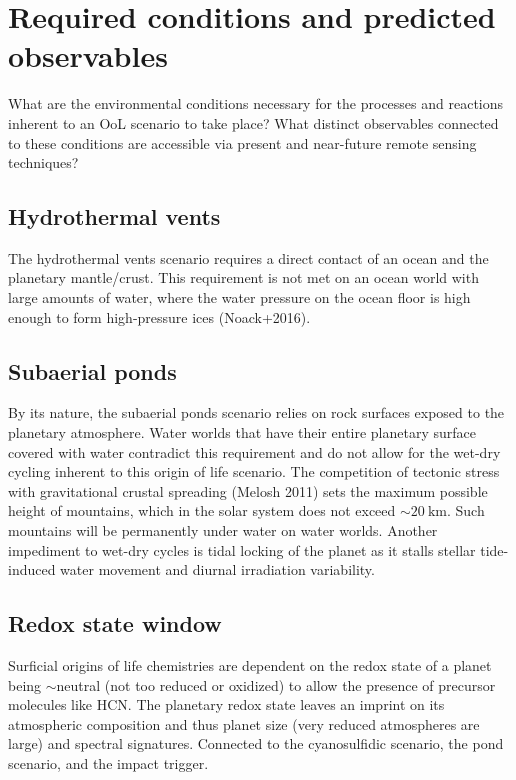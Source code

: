 \documentclass[twocolumn]{aastex631}
\begin{document}
\section{Required conditions and predicted observables}
\label{sec:observables}

What are the environmental conditions necessary for the processes and reactions inherent to an OoL scenario to take place?
What distinct observables connected to these conditions are accessible via present and near-future remote sensing techniques?

\subsection{Hydrothermal vents}
The hydrothermal vents scenario requires a direct contact of an ocean and the planetary mantle/crust.
This requirement is not met on an ocean world with large amounts of water, where the water pressure on the ocean floor is high enough to form high-pressure ices (Noack+2016).


\subsection{Subaerial ponds}
By its nature, the subaerial ponds scenario relies on rock surfaces exposed to the planetary atmosphere.
Water worlds that have their entire planetary surface covered with water contradict this requirement and do not allow for the wet-dry cycling inherent to this origin of life scenario.
The competition of tectonic stress with gravitational crustal spreading (Melosh 2011) sets the maximum possible height of mountains, which in the solar system does not exceed $\sim \SI{20}{\kilo\meter}$.
Such mountains will be permanently under water on water worlds.
Another impediment to wet-dry cycles is tidal locking of the planet as it stalls stellar tide-induced water movement and diurnal irradiation variability.

\subsection{Redox state window}
Surficial origins of life chemistries are dependent on the redox state of a planet being $\sim$neutral (not too reduced or oxidized) to allow the presence of precursor molecules like HCN. The planetary redox state leaves an imprint on its atmospheric composition and thus planet size (very reduced atmospheres are large) and spectral signatures. Connected to the cyanosulfidic scenario, the pond scenario, and the impact trigger.
\end{document}
